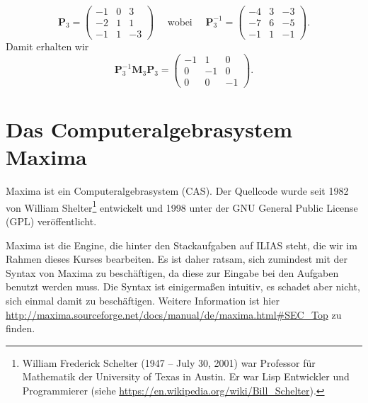\[
\mathbf{P}_3=
\begin{pmatrix}-1&0&3\\ -2&1&1\\ -1&1&-3\end{pmatrix}\quad\text{ wobei }\quad
\mathbf{P}_3^{-1}=
\begin{pmatrix}-4&3&-3\\ -7&6&-5\\ -1&1&-1\end{pmatrix}.
\]
Damit erhalten wir 
\[
\mathbf{P}_3^{-1}\mathbf{M}_3\mathbf{P}_3=
\begin{pmatrix}-1&1&0\\ 0&-1&0\\ 0&0&-1\end{pmatrix}.
\]
\newpage
\section{Das Computeralgebrasystem Maxima}
Maxima ist ein Computeralgebrasystem (CAS). Der Quellcode wurde seit 1982 von William Shelter\footnote{William Frederick Schelter (1947 – July 30, 2001) war Professor für Mathematik der  University of Texas in Austin. Er war Lisp Entwickler und  Programmierer (siehe \url{https://en.wikipedia.org/wiki/Bill_Schelter}).}  entwickelt und 1998 unter der GNU General Public License (GPL) veröffentlicht.

Maxima ist die Engine, die hinter den Stackaufgaben auf ILIAS steht, die wir im Rahmen dieses Kurses bearbeiten. Es ist daher ratsam, sich zumindest mit der Syntax von Maxima zu beschäftigen, da diese zur Eingabe bei den Aufgaben benutzt werden muss. Die Syntax ist einigermaßen intuitiv, es schadet aber nicht, sich einmal damit zu beschäftigen. Weitere Information ist hier 
\url{http://maxima.sourceforge.net/docs/manual/de/maxima.html#SEC_Top} 
zu finden.
\newpage